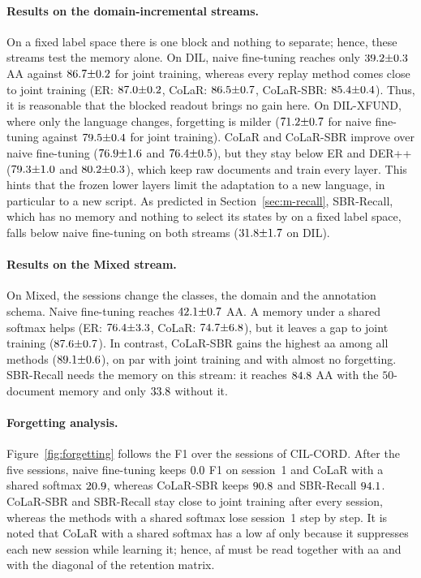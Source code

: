 \paragraph{Results on the domain-incremental streams.} On a fixed label space there is one
block and nothing to separate; hence, these streams test the memory alone. On DIL, naive
fine-tuning reaches only $39.2{\pm}0.3$ AA against $86.7{\pm}0.2$ for joint training, whereas
every replay method comes close to joint training (ER: $87.0{\pm}0.2$, CoLaR: $86.5{\pm}0.7$,
CoLaR-SBR: $85.4{\pm}0.4$). Thus, it is reasonable that the blocked readout brings no gain
here. On DIL-XFUND, where only the language changes, forgetting is milder ($71.2{\pm}0.7$
for naive fine-tuning against $79.5{\pm}0.4$ for joint training). CoLaR and CoLaR-SBR
improve over naive fine-tuning ($76.9{\pm}1.6$ and $76.4{\pm}0.5$), but they stay below ER
and DER++ ($79.3{\pm}1.0$ and $80.2{\pm}0.3$), which keep raw documents and train every
layer. This hints that the frozen lower layers limit the adaptation to a new language, in
particular to a new script. As predicted in Section~\ref{sec:m-recall}, SBR-Recall, which
has no memory and nothing to select its states by on a fixed label space, falls below
naive fine-tuning on both streams ($31.8{\pm}1.7$ on DIL).

\paragraph{Results on the Mixed stream.} On Mixed, the sessions change the classes, the
domain and the annotation schema. Naive fine-tuning reaches $42.1{\pm}0.7$ AA. A memory
under a shared softmax helps (ER: $76.4{\pm}3.3$, CoLaR: $74.7{\pm}6.8$), but it leaves a gap to
joint training ($87.6{\pm}0.7$). In contrast, CoLaR-SBR gains the highest \gls{aa} among all
methods ($89.1{\pm}0.6$), on par with joint training and with almost no forgetting. SBR-Recall
needs the memory on this stream: it reaches $84.8$ AA with the $50$-document
memory and only $33.8$ without it.

\paragraph{Forgetting analysis.} Figure~\ref{fig:forgetting} follows the F1 over the
sessions of CIL-CORD. After the five sessions, naive fine-tuning keeps $0.0$ F1
on session~1 and CoLaR with a shared softmax $20.9$, whereas CoLaR-SBR keeps
$90.8$ and SBR-Recall $94.1$. CoLaR-SBR and SBR-Recall stay close to joint
training after every session, whereas the methods with a shared softmax lose session~1
step by step. It is noted that CoLaR with a shared softmax has a low \gls{af} only because
it suppresses each new session while learning it; hence, \gls{af} must be read together
with \gls{aa} and with the diagonal of the retention matrix.

